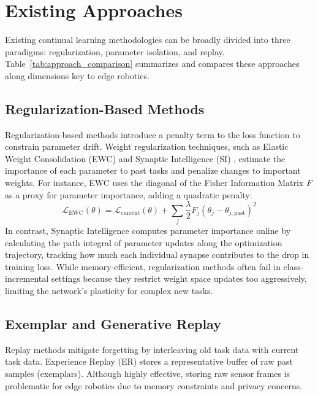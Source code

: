 \section{Existing Approaches}
\label{sec:existing_approaches}

Existing continual learning methodologies can be broadly divided into three paradigms: regularization, parameter isolation, and replay. Table~\ref{tab:approach_comparison} summarizes and compares these approaches along dimensions key to edge robotics.



\subsection{Regularization-Based Methods}
Regularization-based methods introduce a penalty term to the loss function to constrain parameter drift. Weight regularization techniques, such as Elastic Weight Consolidation (EWC) \cite{kirkpatrickOvercomingCatastrophicForgetting2017} and Synaptic Intelligence (SI) \cite{wangComprehensiveSurveyContinual2024}, estimate the importance of each parameter to past tasks and penalize changes to important weights. For instance, EWC uses the diagonal of the Fisher Information Matrix $F$ as a proxy for parameter importance, adding a quadratic penalty:
\begin{equation}
    \mathcal{L}_{\text{EWC}}(\theta) = \mathcal{L}_{\text{current}}(\theta) + \sum_{j} \frac{\lambda}{2} F_{j} (\theta_j - \theta_{j,\text{past}})^2
    \label{eq:ewc_loss}
\end{equation}
In contrast, Synaptic Intelligence computes parameter importance online by calculating the path integral of parameter updates along the optimization trajectory, tracking how much each individual synapse contributes to the drop in training loss. While memory-efficient, regularization methods often fail in class-incremental settings because they restrict weight space updates too aggressively, limiting the network's plasticity for complex new tasks.

\subsection{Exemplar and Generative Replay}
Replay methods mitigate forgetting by interleaving old task data with current task data. Experience Replay (ER) \cite{riemer2019learning} stores a representative buffer of raw past samples (exemplars). Although highly effective, storing raw sensor frames is problematic for edge robotics due to memory constraints and privacy concerns. 


